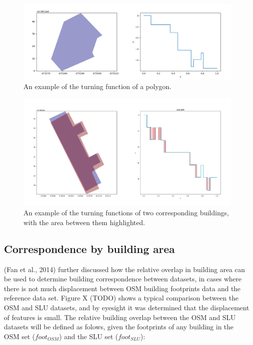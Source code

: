 \documentclass[a4paper]{article}
\begin{document}
\begin{figure}[H]
    \centering
    \includegraphics[width=\textwidth,height=0.5\textheight,keepaspectratio]{img_turn_function}
    \caption{An example of the turning function of a polygon.}
    \label{fig:space}
\end{figure}

\begin{figure}[H]
    \centering
    \includegraphics[width=\textwidth,height=0.5\textheight,keepaspectratio]{img_turn_function_diff_filled}
    \caption{An example of the turning functions of two corresponding buildings, with the area between them highlighted.}
    \label{fig:space}
\end{figure}

\subsection{Correspondence by building area}

(Fan et al., 2014) further discussed how the relative overlap in building area can be used to determine building correspondence between datasets, in cases where there is not much displacement between OSM building footprints data and the reference data set. Figure X (TODO) shows a typical comparison between the OSM and SLU datasets, and by eyesight it was determined that the displacement of features is small. The relative building overlap between the OSM and SLU datasets will be defined as folows, given the footprints of any building in the OSM set ($foot_{OSM}$) and the SLU set ($foot_{SLU}$):
\end{document}
